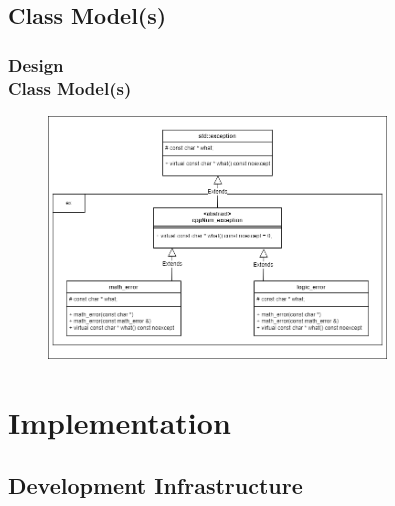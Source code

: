 \documentclass[ucs,10pt]{beamer}
\begin{document}
\subsection{Class Model(s)}

\begin{frame}
\frametitle{Design \\
	\small \color{rwth-blue} Class Model(s)}
	\begin{figure}
                \centering
                \includegraphics[width=0.8\textwidth]{figures/class_diagramm.png}
        \end{figure}
\end{frame}



\section{Implementation}

\subsection{Development Infrastructure}
\end{document}

